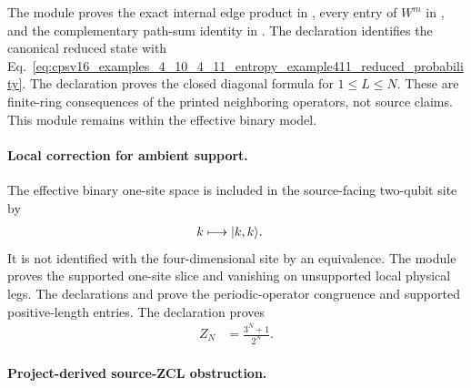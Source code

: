 \documentclass{article}
\begin{document}
The module  proves the
exact internal edge product in
, every
entry of $W^m$ in
, and the
complementary path-sum identity in
.
The declaration
identifies the canonical reduced state with
Eq.~\ref{eq:cpsv16_examples_4_10_4_11_entropy_example411_reduced_probability}.
The declaration
 proves
the closed diagonal formula for $1\leq L\leq N$. These are finite-ring
consequences of the printed neighboring operators, not source claims. This
module remains within the effective binary model.

\paragraph{Local correction for ambient support.}

The effective binary one-site space is included in the source-facing
two-qubit site by
\begin{align}
    k
        &\longmapsto |k,k\rangle.
    \label{eq:cpsv16_examples_4_10_4_11_entropy_example411_support_inclusion}
\end{align}
It is not identified with the four-dimensional site by an equivalence. The
module  proves the supported
one-site slice and vanishing on unsupported local physical legs. The
declarations
 and
 prove the
periodic-operator congruence and supported positive-length entries. The
declaration
 proves
\begin{align}
    Z_N
        &= \frac{3^N+1}{2^N}.
    \label{eq:cpsv16_examples_4_10_4_11_entropy_example411_ambient_trace}
\end{align}

\paragraph{Project-derived source-ZCL obstruction.}
\end{document}
